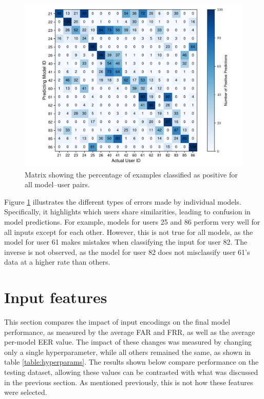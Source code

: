 \begin{figure}[H]
	\centering
	\includegraphics[width=\textwidth]{images/all_models_5_len40.pdf}
	\caption{Matrix showing the percentage of examples classified as positive for all model--user pairs.}
	\label{fig:all_models_5_len40}
\end{figure}

Figure \ref{fig:all_models_5_len40} illustrates the different types of errors made by individual models. Specifically, it highlights which users share similarities, leading to confusion in model predictions. For example, models for users 25 and 86 perform very well for all inputs except for each other. However, this is not true for all models, as the model for user 61 makes mistakes when classifying the input for user 82. The inverse is not observed, as the model for user 82 does not misclassify user 61's data at a higher rate than others.

\section{Input features}
This section compares the impact of input encodings on the final model performance, as measured by the average FAR and FRR, as well as the average per-model EER value. The impact of these changes was measured by changing only a single hyperparameter, while all others remained the same, as shown in table \ref{table:hyperparams}. The results shown below compare performance on the testing dataset, allowing these values can be contrasted with what was discussed in the previous section. As mentioned previously, this is not how these features were selected.

